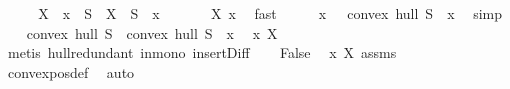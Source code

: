 \begin{isabellebody}
\ \ \isamarkupfalse%
\ \isamarkupfalse%
\ {\isachardoublequoteopen}{\isacharparenleft}{\kern0pt}{\isacharparenleft}{\kern0pt}X\ {\isacharminus}{\kern0pt}\ {\isacharbraceleft}{\kern0pt}x{\isacharbraceright}{\kern0pt}{\isacharparenright}{\kern0pt}\ {\isasymunion}\ {\isacharparenleft}{\kern0pt}S\ {\isacharminus}{\kern0pt}\ X{\isacharparenright}{\kern0pt}{\isacharparenright}{\kern0pt}\ {\isacharequal}{\kern0pt}\ {\isacharparenleft}{\kern0pt}S\ {\isacharminus}{\kern0pt}\ {\isacharbraceleft}{\kern0pt}x{\isacharbraceright}{\kern0pt}{\isacharparenright}{\kern0pt}{\isachardoublequoteclose}\ \isanewline
\ \ \ \ \isamarkupfalse%
\ X{\isacharparenleft}{\kern0pt}{}{\isacharparenright}{\kern0pt}\ x{\isacharparenleft}{\kern0pt}{}{\isacharparenright}{\kern0pt}\ \isamarkupfalse%
\ fast\isanewline
\ \ \isamarkupfalse%
\ \isamarkupfalse%
\ {\isachardoublequoteopen}x\ {\isasymin}\ \ convex\ hull\ {\isacharparenleft}{\kern0pt}S\ {\isacharminus}{\kern0pt}\ {\isacharbraceleft}{\kern0pt}x{\isacharbraceright}{\kern0pt}{\isacharparenright}{\kern0pt}{\isachardoublequoteclose}\ \isamarkupfalse%
\ simp\isanewline
\ \ \isamarkupfalse%
\ {\isachardoublequoteopen}convex\ hull\ S\ {\isacharequal}{\kern0pt}\ convex\ hull\ {\isacharparenleft}{\kern0pt}S\ {\isacharminus}{\kern0pt}\ {\isacharbraceleft}{\kern0pt}x{\isacharbraceright}{\kern0pt}{\isacharparenright}{\kern0pt}{\isachardoublequoteclose}\ \isamarkupfalse%
\ x{\isacharparenleft}{\kern0pt}{}{\isacharparenright}{\kern0pt}\ X{\isacharparenleft}{\kern0pt}{}{\isacharparenright}{\kern0pt}\ \isanewline
\ \ \ \ \isamarkupfalse%
\ {\isacharparenleft}{\kern0pt}metis\ hull{\isacharunderscore}{\kern0pt}redundant\ in{\isacharunderscore}{\kern0pt}mono\ insert{\isacharunderscore}{\kern0pt}Diff{\isacharparenright}{\kern0pt}\isanewline
\ \ \isamarkupfalse%
\ False\ \isamarkupfalse%
\ x{\isacharparenleft}{\kern0pt}{}{\isacharparenright}{\kern0pt}\ X{\isacharparenleft}{\kern0pt}{}{\isacharparenright}{\kern0pt}\ assms\ \isanewline
\ \ \ \ \isamarkupfalse%
\ convex{\isacharunderscore}{\kern0pt}pos{\isacharunderscore}{\kern0pt}def\ \isamarkupfalse%
\ auto\isanewline
{}\isamarkupfalse%
%
\endisatagproof
{\isafoldproof}%
%
\isadelimproof
\isanewline
%
\endisadelimproof
\isanewline
\isanewline

\end{isabellebody}
